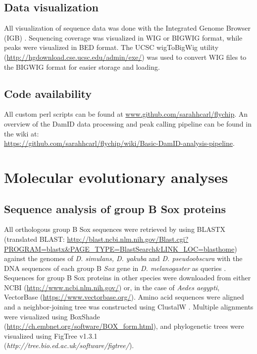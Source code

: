 \subsection{Data visualization}
All visualization of sequence data was done with the Integrated Genome Browser (IGB) \citep{nicol_integrated_2009}. Sequencing coverage was visualized in WIG or BIGWIG format, while peaks were visualized in BED format. The UCSC wigToBigWig utility (\url{http://hgdownload.cse.ucsc.edu/admin/exe/}) was used to convert WIG files to the BIGWIG format for easier storage and loading.

\subsection{Code availability}
All custom perl scripts can be found at \url{www.github.com/sarahhcarl/flychip}. An overview of the DamID data processing and peak calling pipeline can be found in the wiki at:\\
\url{https://github.com/sarahhcarl/flychip/wiki/Basic-DamID-analysis-pipeline}.

\section{Molecular evolutionary analyses}
\subsection{Sequence analysis of group B Sox proteins}
All orthologous group B Sox sequences were retrieved by using BLASTX (translated BLAST: \url{http://blast.ncbi.nlm.nih.gov/Blast.cgi?PROGRAM=blastx&PAGE_TYPE=BlastSearch&LINK_LOC=blasthome}) against the genomes of \emph{D. simulans, D. yakuba} and \emph{D. pseudoobscura} with the DNA sequences of each group B \emph{Sox} gene in \emph{D. melanogaster} as queries \citep{altschul_basic_1990}. Sequences for group B Sox proteins in other species were downloaded from either NCBI (\url{http://www.ncbi.nlm.nih.gov/}) or, in the case of \emph{Aedes aegypti}, VectorBase (\url{https://www.vectorbase.org/}). Amino acid sequences were aligned and a neighbor-joining tree was constructed using ClustalW \citep{chenna_multiple_2003}. Multiple alignments were visualized using BoxShade (\url{http://ch.embnet.org/software/BOX_form.html}), and phylogenetic trees were visualized using FigTree v1.3.1\\
(\emph{http://tree.bio.ed.ac.uk/software/figtree/}).

